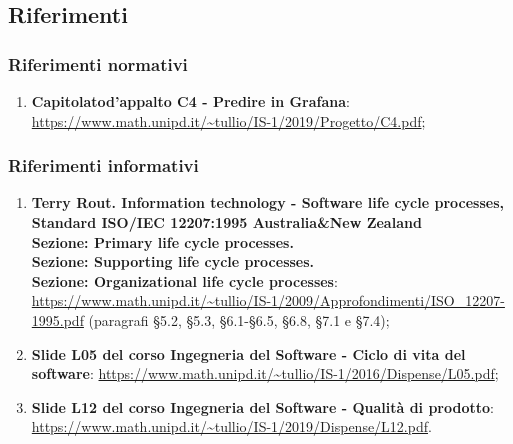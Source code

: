 \subsection{Riferimenti}
\subsubsection{Riferimenti normativi}
\begin{enumerate}
	\item \textbf{Capitolato}\glosp \textbf{d'appalto C4 - Predire in Grafana}\glo: \url{https://www.math.unipd.it/~tullio/IS-1/2019/Progetto/C4.pdf};
\end{enumerate}
\subsubsection{Riferimenti informativi}
\begin{enumerate}
	\item \textbf{Terry Rout. Information technology - Software life cycle processes, Standard ISO/IEC 12207:1995 Australia\&New Zealand \\ Sezione: Primary life cycle processes. \\ Sezione: Supporting life cycle processes. \\ Sezione: Organizational life cycle processes}: \url{https://www.math.unipd.it/~tullio/IS-1/2009/Approfondimenti/ISO_12207-1995.pdf} (paragrafi §5.2, §5.3, §6.1-§6.5, §6.8, §7.1 e §7.4);
	\item \textbf{Slide L05 del corso Ingegneria del Software - Ciclo di vita del software}: \url{https://www.math.unipd.it/~tullio/IS-1/2016/Dispense/L05.pdf};
	\item \textbf{Slide L12 del corso Ingegneria del Software - Qualità di prodotto}: \url{https://www.math.unipd.it/~tullio/IS-1/2019/Dispense/L12.pdf}.

	
	
	
	
	
\end{enumerate}


